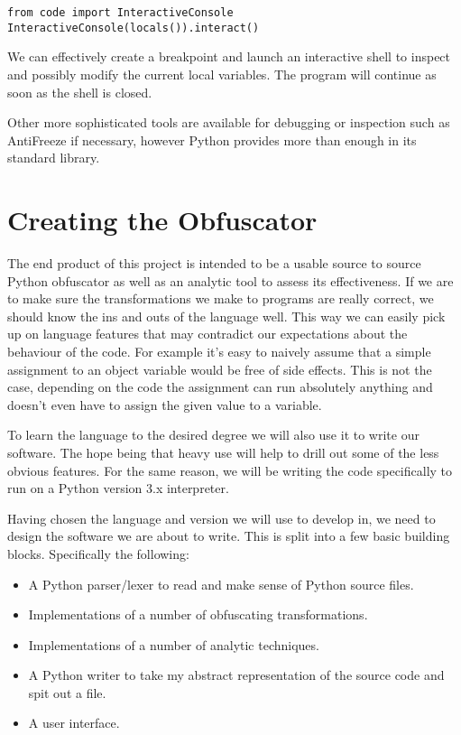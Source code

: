 \documentclass{report}
\begin{document}
\begin{lstlisting}
from code import InteractiveConsole
InteractiveConsole(locals()).interact()
\end{lstlisting}

We can effectively create a breakpoint and launch an interactive shell to inspect and possibly modify the current local
variables. The program will continue as soon as the shell is closed.

Other more sophisticated tools are available for debugging or inspection such as AntiFreeze \cite{pirates} if necessary,
however Python provides more than enough in its standard library.

\section{Creating the Obfuscator}

The end product of this project is intended to be a usable source to source Python obfuscator as well as an analytic tool
to assess its effectiveness. If we are to make sure the transformations we make to programs are really correct, we should
know the ins and outs of the language well. This way we can easily pick up on language features that may contradict our
expectations about the behaviour of the code. For example it's easy to naively assume that a simple assignment to an object
variable would be free of side effects. This is not the case, depending on the code the assignment can run absolutely
anything \cite{pyprop} and doesn't even have to assign the given value to a variable.

To learn the language to the desired degree we will also use it to write our software. The hope being that heavy use will help to
drill out some of the less obvious features. For the same reason, we will be writing the code specifically to run on a Python version 3.x
interpreter.

Having chosen the language and version we will use to develop in, we need to design the software we are about to write. This is split into a few basic building
blocks. Specifically the following:

\begin{itemize}
\item A Python parser/lexer to read and make sense of Python source files.
\item Implementations of a number of obfuscating transformations.
\item Implementations of a number of analytic techniques.
\item A Python writer to take my abstract representation of the source code and spit out a file.
\item A user interface.
\end{itemize}
\end{document}
